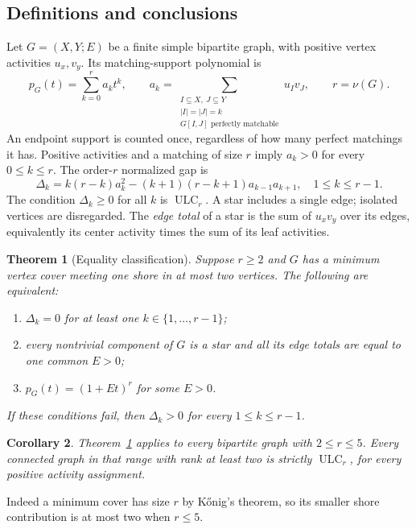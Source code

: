 \documentclass[11pt,a4paper]{article}
\newtheorem{theorem}{Theorem}[section]
\newtheorem{corollary}[theorem]{Corollary}
\theoremstyle{remark}\newtheorem{remark}[theorem]{Remark}
\newcommand{\ULC}{\operatorname{ULC}}      %
\begin{document}
\subsection{Definitions and conclusions}
Let $G=(X,Y;E)$ be a finite simple bipartite graph, with positive vertex activities $u_x,v_y$. Its matching-support polynomial is
\[
 p_G(t)=\sum_{k=0}^{r}a_kt^k,\qquad
 a_k=\sum_{\substack{I\subseteq X,\ J\subseteq Y\\|I|=|J|=k\\G[I,J]\text{ perfectly matchable}}}u_Iv_J,
 \qquad r=\nu(G).
\]
An endpoint support is counted once, regardless of how many perfect matchings it has. Positive activities and a matching of size $r$ imply $a_k>0$ for every $0\le k\le r$. The order-$r$ normalized gap is
\begin{equation}\label{mrn:w:se:eq:gap}
 \Delta_k=k(r-k)a_k^2-(k+1)(r-k+1)a_{k-1}a_{k+1},
 \quad 1\le k\le r-1.
\end{equation}
The condition $\Delta_k\ge0$ for all $k$ is $\ULC_r$. A star includes a single edge; isolated vertices are disregarded. The \emph{edge total} of a star is the sum of $u_xv_y$ over its edges, equivalently its center activity times the sum of its leaf activities.

\begin{theorem}[Equality classification]\label{mrn:w:se:thm:main}
Suppose $r\ge2$ and $G$ has a minimum vertex cover meeting one shore in at most two vertices. The following are equivalent:
\begin{enumerate}
\item $\Delta_k=0$ for at least one $k\in\{1,\ldots,r-1\}$;
\item every nontrivial component of $G$ is a star and all its edge totals are equal to one common $E>0$;
\item $p_G(t)=(1+Et)^r$ for some $E>0$.
\end{enumerate}
If these conditions fail, then $\Delta_k>0$ for every $1\le k\le r-1$.
\end{theorem}

\begin{corollary}\label{mrn:w:se:cor:smallrank}
Theorem~\ref{mrn:w:se:thm:main} applies to every bipartite graph with $2\le r\le5$. Every connected graph in that range with rank at least two is strictly $\ULC_r$, for every positive activity assignment.
\end{corollary}
Indeed a minimum cover has size $r$ by K\H{o}nig's theorem, so its smaller shore contribution is at most two when $r\le5$.
\end{document}
